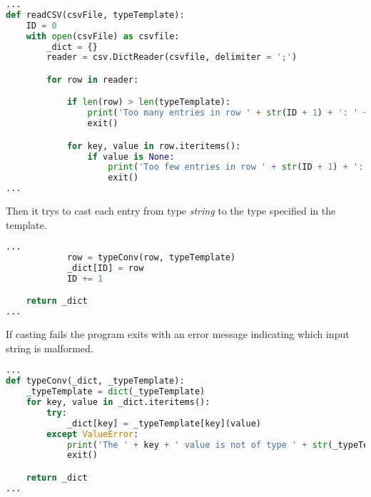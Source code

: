 \begin{inconsolata}
\begin{minipage}{\linewidth}
\begin{lstlisting}[language=python]
...
def readCSV(csvFile, typeTemplate):
    ID = 0
    with open(csvFile) as csvfile:
        _dict = {}
        reader = csv.DictReader(csvfile, delimiter = ';')

        for row in reader:

            if len(row) > len(typeTemplate):
                print('Too many entries in row ' + str(ID + 1) + ': ' + csvFile)
                exit()

            for key, value in row.iteritems():
                if value is None:
                    print('Too few entries in row ' + str(ID + 1) + ': ' + csvFile)
                    exit()
...
\end{lstlisting}
\end{minipage}
\end{inconsolata}

Then it trys to cast each entry from type \textit{string} to the type specified in the template.

\begin{inconsolata}
\begin{minipage}{\linewidth}
\begin{lstlisting}[language=python]
...
            row = typeConv(row, typeTemplate)
            _dict[ID] = row
            ID += 1

    return _dict
...
\end{lstlisting}
\end{minipage}
\end{inconsolata}

If casting fails the program exits with an error message indicating which input string is malformed.

\begin{inconsolata}
\begin{minipage}{\linewidth}
\begin{lstlisting}[language=python]
...
def typeConv(_dict, _typeTemplate):
    _typeTemplate = dict(_typeTemplate)
    for key, value in _dict.iteritems():
        try:
            _dict[key] = _typeTemplate[key](value)
        except ValueError:
            print('The ' + key + ' value is not of type ' + str(_typeTemplate[key]) + '.')
            exit()

    return _dict
...
\end{lstlisting}
\end{minipage}
\end{inconsolata}

